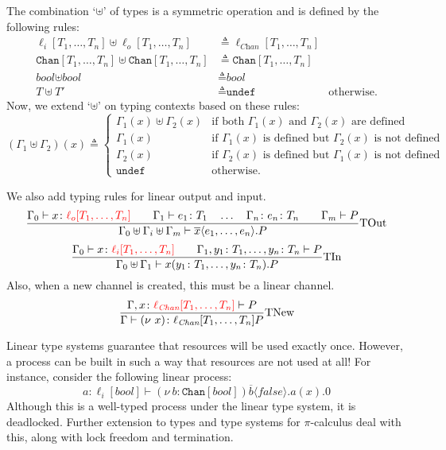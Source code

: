 \documentclass[a4paper, openany]{memoir}
\theoremstyle{definition}
\begin{document}
    The combination `$\uplus$' of types is a symmetric operation and is defined by the following rules:
    \begin{align*}
        \ell_i[T_1, \dots, T_n] \uplus \ell_o[T_1, \dots, T_n] &\triangleq \ell_{\textit{Chan}}[T_1, \dots, T_n] \\
        \texttt{Chan}[T_1, \dots, T_n] \uplus \texttt{Chan}[T_1, \dots, T_n] &\triangleq \texttt{Chan}[T_1, \dots, T_n] \\
        \textit{bool} \uplus \textit{bool} &\triangleq \textit{bool} \\
        T \uplus T' &\triangleq \texttt{undef} & \textrm{otherwise}.
    \end{align*}
    Now, we extend `$\uplus$' on typing contexts based on these rules:
    \[(\Gamma_1 \uplus \Gamma_2)(x) \triangleq \begin{cases}
        \Gamma_1(x) \uplus \Gamma_2(x) & \textrm{if both } \Gamma_1(x) \textrm{ and } \Gamma_2(x) \textrm{ are defined} \\
        \Gamma_1(x) & \textrm{if } \Gamma_1(x) \textrm{ is defined but } \Gamma_2(x) \textrm{ is not defined} \\
        \Gamma_2(x) & \textrm{if } \Gamma_2(x) \textrm{ is defined but } \Gamma_1(x) \textrm{ is not defined} \\
        \texttt{undef} & \textrm{otherwise}.
    \end{cases}\]
    
    We also add typing rules for linear output and input.
    \[\frac{\Gamma_0 \vdash x \colon {\color{red}\ell_o[T_1, \dots, T_n]} \qquad \Gamma_1 \vdash e_1 \colon T_1 \quad \dots \quad \Gamma_n \colon  e_n \colon T_n \qquad \Gamma_m \vdash P}{\Gamma_0 \uplus \Gamma_i \uplus \Gamma_m \vdash \overline{x} \langle e_1, \dots, e_n \rangle.P} \textrm{TOut}\]
    \[\frac{\Gamma_0 \vdash x \colon {\color{red}\ell_i[T_1, \dots, T_n]} \qquad \Gamma_1, y_1 \colon T_1, \dots, y_n \colon T_n \vdash P}{\Gamma_0 \uplus \Gamma_1 \vdash x(y_1 \colon T_1, \dots, y_n \colon T_n).P} \textrm{TIn}\]
    Also, when a new channel is created, this must be a linear channel.
    \[\frac{\Gamma, x \colon {\color{red} \ell_{\textit{Chan}}[T_1, \dots, T_n]} \vdash P}{\Gamma \vdash (\nu \ x) \colon \ell_{\textit{Chan}}[T_1, \dots, T_n] P} \textrm{TNew}\]

    Linear type systems guarantee that resources will be used exactly once. However, a process can be built in such a way that resources are not used at all! For instance, consider the following linear process:
    \[a \colon \ell_i[\textit{bool}] \vdash (\nu \ b\colon \texttt{Chan}[\textit{bool}] )\overline{b} \langle \textit{false} \rangle.a(x).0\]
    Although this is a well-typed process under the linear type system, it is deadlocked. Further extension to types and type systems for $\pi$-calculus deal with this, along with lock freedom and termination.
\end{document}
